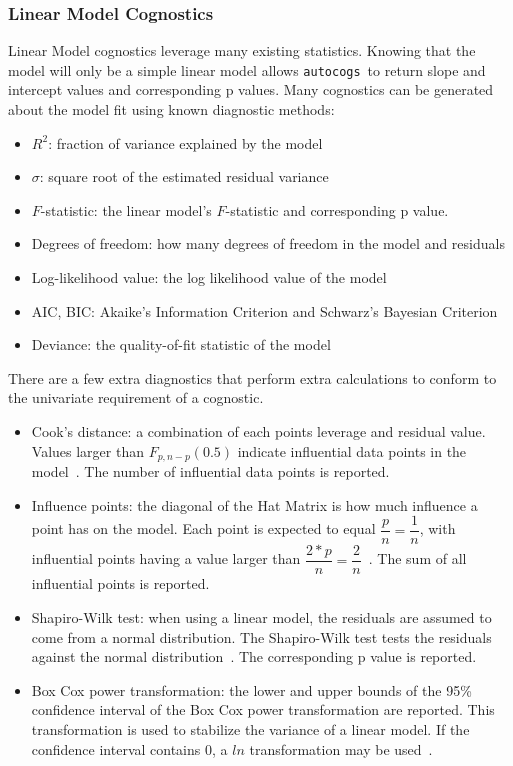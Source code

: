 \documentclass[stat,dissertation]{puthesis}\usepackage[]{graphicx}\usepackage{xcolor}
\newcommand{\pkg}[1]{\texttt{#1}}
\newcommand{\autocogs}{\pkg{autocogs}}
\begin{document}
\subsubsection{Linear Model Cognostics}

Linear Model cognostics leverage many existing statistics.  Knowing that the model will only be a simple linear model allows \autocogs~to return slope and intercept values and corresponding p values.  Many cognostics can be generated about the model fit using known diagnostic methods:
  \begin{itemize}
    \item $R^2$: fraction of variance explained by the model
    \item $\sigma$: square root of the estimated residual variance
    \item $F$-statistic: the linear model's $F$-statistic and corresponding p value.
    \item Degrees of freedom: how many degrees of freedom in the model and residuals
    \item Log-likelihood value: the log likelihood value of the model
    \item AIC, BIC: Akaike's Information Criterion and Schwarz's Bayesian Criterion
    \item Deviance: the quality-of-fit statistic of the model
  \end{itemize}

  There are a few extra diagnostics that perform extra calculations to conform to the univariate requirement of a cognostic.

  \begin{itemize}
    \item Cook's distance: a combination of each points leverage and residual value.  Values larger than $F_{p, n - p}(0.5)$ indicate influential data points in the model~\cite{kutner_linear_models}.  The number of influential data points is reported.
    \item Influence points: the diagonal of the Hat Matrix is how much influence a point has on the model.  Each point is expected to equal $\dfrac{p}{n} = \dfrac{1}{n}$, with influential points having a value larger than $\dfrac{2 * p}{n} = \dfrac{2}{n}$~\cite{kutner_linear_models}.  The sum of all influential points is reported.
    \item Shapiro-Wilk test: when using a linear model, the residuals are assumed to come from a normal distribution. The Shapiro-Wilk test tests the residuals against the normal distribution~\cite{kutner_linear_models}.  The corresponding p value is reported.
    \item Box Cox power transformation: the lower and upper bounds of the 95\% confidence interval of the Box Cox power transformation are reported. This transformation is used to  stabilize the variance of a linear model. If the confidence interval contains 0, a $ln$ transformation may be used~\cite{kutner_linear_models}.
  \end{itemize}
\end{document}
